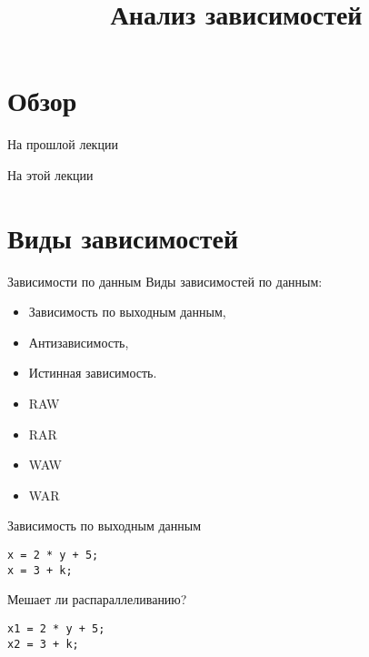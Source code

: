 

\title{Анализ зависимостей}



\begin{frame}
\titlepage
\end{frame}

\section*{Обзор}

\begin{frame}{На прошлой лекции}
\end{frame}

\begin{frame}{На этой лекции}
\tableofcontents
\end{frame} 

\section{Виды зависимостей}

\begin{frame}{Зависимости по данным}
Виды зависимостей по данным:

\begin{itemize}
    \item Зависимость по выходным данным,
    \item Антизависимость,
    \item Истинная зависимость.
\end{itemize}
\end{frame}

\begin{frame}

\begin{itemize}
  \item RAW
  \item RAR
  \item WAW
  \item WAR
\end{itemize}

\end{frame}

\begin{frame}[fragile]{Зависимость по выходным данным}
\begin{lstlisting}
x = 2 * y + 5;
x = 3 + k;
\end{lstlisting}

Мешает ли распараллеливанию?

\pause

\begin{lstlisting}
x1 = 2 * y + 5;
x2 = 3 + k;
\end{lstlisting}
\end{frame}

